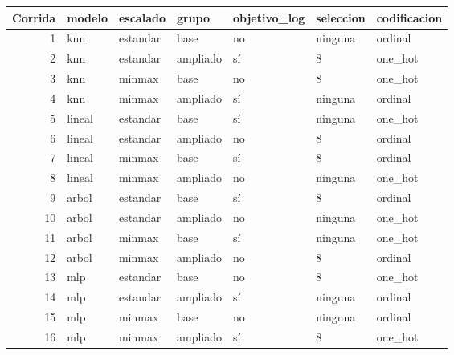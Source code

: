 \begin{tabular}{rllllll}
\toprule
Corrida & modelo & escalado & grupo & objetivo\_log & seleccion & codificacion \\
\midrule
1 & knn & estandar & base & no & ninguna & ordinal \\
2 & knn & estandar & ampliado & sí & 8 & one\_hot \\
3 & knn & minmax & base & no & 8 & one\_hot \\
4 & knn & minmax & ampliado & sí & ninguna & ordinal \\
5 & lineal & estandar & base & sí & ninguna & one\_hot \\
6 & lineal & estandar & ampliado & no & 8 & ordinal \\
7 & lineal & minmax & base & sí & 8 & ordinal \\
8 & lineal & minmax & ampliado & no & ninguna & one\_hot \\
9 & arbol & estandar & base & sí & 8 & ordinal \\
10 & arbol & estandar & ampliado & no & ninguna & one\_hot \\
11 & arbol & minmax & base & sí & ninguna & one\_hot \\
12 & arbol & minmax & ampliado & no & 8 & ordinal \\
13 & mlp & estandar & base & no & 8 & one\_hot \\
14 & mlp & estandar & ampliado & sí & ninguna & ordinal \\
15 & mlp & minmax & base & no & ninguna & ordinal \\
16 & mlp & minmax & ampliado & sí & 8 & one\_hot \\
\bottomrule
\end{tabular}

